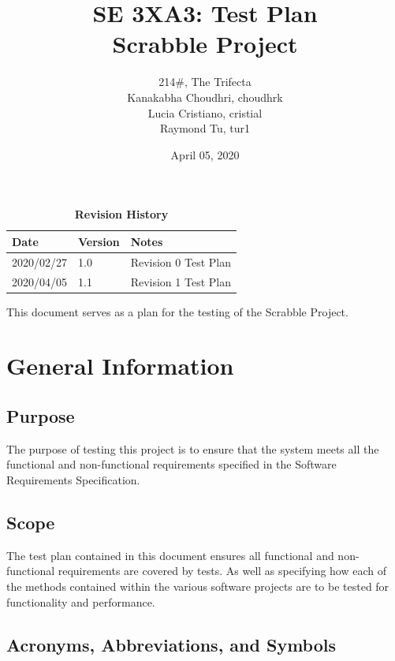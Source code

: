 \documentclass[12pt, titlepage]{article}
\title{SE 3XA3: Test Plan\\Scrabble Project}
\author{214\#, The Trifecta
		\\ Kanakabha Choudhri, choudhrk
		\\ Lucia Cristiano, cristial
		\\ Raymond Tu, tur1
}
\date{April 05, 2020}
\begin{document}
\maketitle

\tableofcontents
\listoftables
\listoffigures

\begin{table}[bp]
\caption{\bf Revision History}
\begin{tabularx}{\textwidth}{p{3cm}p{2cm}X}
\toprule {\bf Date} & {\bf Version} & {\bf Notes}\\
\midrule
2020/02/27 & 1.0 & Revision 0 Test Plan\\
2020/04/05 & 1.1 & Revision 1 Test Plan\\
\bottomrule
\end{tabularx}
\end{table}

\newpage


This document serves as a plan for the testing of the Scrabble Project.

\section{General Information} 

\subsection{Purpose}

The purpose of testing this project is to ensure that the system meets all the functional and non-functional requirements specified in the Software Requirements Specification.

\subsection{Scope}

The test plan contained in this document ensures all  functional and non-functional requirements are covered by tests. As well as specifying how each of the methods contained within the various software projects are to be tested for functionality and performance.

\subsection{Acronyms, Abbreviations, and Symbols}
	
\end{document}
